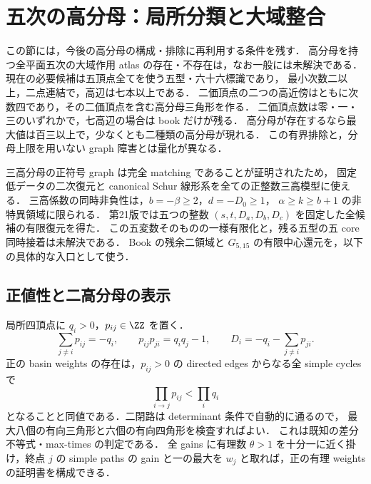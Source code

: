 \section{五次の高分母：局所分類と大域整合}
\label{nt19:denominators}

この節には，今後の高分母の構成・排除に再利用する条件を残す．
高分母を持つ全平面五次の大域作用 atlas の存在・不存在は，なお一般には未解決である．
現在の必要候補は五頂点全てを使う五型・六十六標識であり，
最小次数二以上，二点連結で，高辺は七本以上である．
二価頂点の二つの高近傍はともに次数四であり，その二価頂点を含む高分母三角形を作る．
二価頂点数は零・一・三のいずれかで，七高辺の場合は book だけが残る．
高分母が存在するなら最大値は百三以上で，少なくとも二種類の高分母が現れる．
この有界排除と，分母上限を用いない graph 障害とは量化が異なる．

三高分母の正符号 graph は完全 matching であることが証明されたため，
固定低データの二次復元と canonical Schur 線形系を全ての正整数三高模型に使える．
三高係数の同時非負性は，$b=-\beta\ge2$，$d=-D_0\ge1$，
$\alpha\ge k\ge b+1$ の非特異領域に限られる．
第21版では五つの整数 $(s,t,D_a,D_b,D_c)$ を固定した全候補の有限復元を得た．
この五変数そのものの一様有限化と，残る五型の五 core 同時接着は未解決である．
Book の残余二領域と $G_{5,15}$ の有限中心還元を，以下の具体的な入口として使う．

\subsection{正値性と二高分母の表示}

局所四頂点に $q_i>0$，$p_{ij}\in\ZZ$ を置く．
\[
 \sum_{j\ne i}p_{ij}=-q_i,\qquad
 p_{ij}p_{ji}=q_iq_j-1,\qquad
 D_i=-q_i-\sum_{j\ne i}p_{ji}.
\]
正の basin weights の存在は，$p_{ij}>0$ の directed edges からなる全 simple cycles で
\[
 \prod_{i\to j}p_{ij}<\prod_iq_i
\]
となることと同値である．二閉路は determinant 条件で自動的に通るので，
最大八個の有向三角形と六個の有向四角形を検査すればよい．
これは既知の差分不等式・max-times の判定\cite[\S2]{SergeevSchneiderButkovic}である．
全 gains に有理数 $\theta>1$ を十分一に近く掛け，終点 $j$ の simple paths の gain と一の最大を
$w_j$ と取れば，正の有理 weights の証明書を構成できる．

